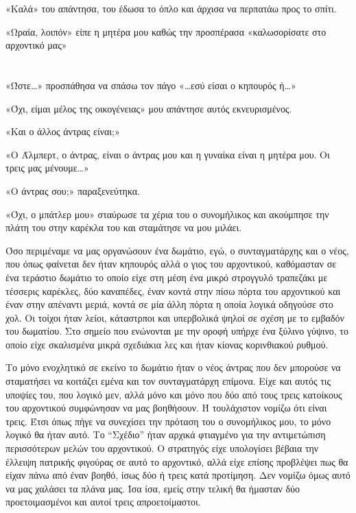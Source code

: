 \documentclass[12pt,twoside, openany]{book}
\begin{document}
«Καλά» του απάντησα, του έδωσα το όπλο και άρχισα να περπατάω προς το σπίτι.

«Ωραία, λοιπόν» είπε η μητέρα μου καθώς την προσπέρασα «καλωσορίσατε στο αρχοντικό μας»


\chapter{}

«Ώστε…» προσπάθησα να σπάσω τον πάγο «…εσύ είσαι ο κηπουρός ή…»

«Όχι, είμαι μέλος της οικογένειας» μου απάντησε αυτός εκνευρισμένος.

«Και ο άλλος άντρας είναι;»

«Ο Άλμπερτ, ο άντρας, είναι ο άντρας μου και η γυναίκα είναι η μητέρα μου. Οι τρεις μας μένουμε…»

«Ο άντρας σου;» παραξενεύτηκα.

«Όχι, ο μπάτλερ μου» σταύρωσε τα χέρια του ο συνομήλικος και ακούμπησε την πλάτη του στην καρέκλα του και σταμάτησε να μου μιλάει.

Όσο περιμέναμε να μας οργανώσουν ένα δωμάτιο, εγώ, ο συνταγματάρχης και ο νέος, που όπως φαίνεται δεν ήταν κηπουρός αλλά ο γιος του αρχοντικού, καθόμασταν σε ένα τεράστιο δωμάτιο το οποίο είχε στη μέση ένα μικρό στρογγυλό τραπεζάκι με τέσσερις καρέκλες, δύο καναπέδες, έναν κοντά στην πίσω πόρτα του αρχοντικού και έναν στην απέναντι μεριά, κοντά σε μία άλλη πόρτα η οποία λογικά οδηγούσε στο χολ. Οι τοίχοι ήταν λείοι, κάταστρποι και υπερβολικά ψηλοί σε σχέση με το εμβαδόν του δωματίου. Στο σημείο που ενώνονται με την οροφή υπήρχε ένα ξύλινο γύψινο, το οποίο είχε σκαλισμένα μικρά σχεδιάκια λες και ήταν κίονας κορινθιακού ρυθμού. 

Το μόνο ενοχλητικό σε εκείνο το δωμάτιο ήταν ο νέος άντρας που δεν μπορούσε να σταματήσει να κοιτάζει εμένα και τον συνταγματάρχη επίμονα. Είχε και αυτός τις υποψίες του, που λογικό μεν, αλλά μόνο και μόνο που δύο από τους τρεις κατοίκους του αρχοντικού συμφώνησαν να μας βοηθήσουν. Ή τουλάχιστον νομίζω ότι είναι τρεις. Έτσι όπως πήγε να συνεχίσει την πρόταση του ο συνομήλικος μου, το μόνο λογικό θα ήταν αυτό. Το “Σχέδιο” ήταν αρχικά φτιαγμένο για την αντιμετώπιση περισσότερων μελών του αρχοντικού. Ο στρατηγός είχε υπολογίσει βέβαια την έλλειψη πατρικής φιγούρας σε αυτό το αρχοντικό, αλλά είχε επίσης προβλέψει πως θα είχαν πάνω από έναν βοηθό, ίσως δύο ή τρεις κατά προτίμηση. Δεν νομίζω όμως αυτό να μας χαλάσει τα πλάνα μας. Ίσα ίσα, εμείς στην τελική θα ήμασταν δύο προετοιμασμένοι και αυτοί τρεις απροετοίμαστοι. 
\end{document}
